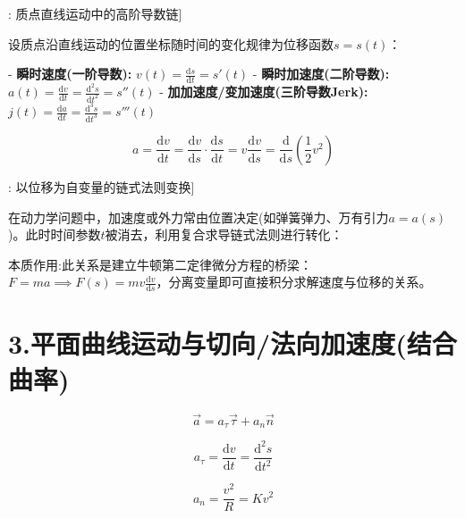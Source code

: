 \documentclass[11pt,a4paper,UTF8]{ctexart}
\begin{document}
\begin{thmbox}[原理[1]: 质点直线运动中的高阶导数链]

设质点沿直线运动的位置坐标随时间的变化规律为位移函数$s = s(t)$：

- \textbf{瞬时速度(一阶导数):} $v(t) = \frac{\mathrm{d}s}{\mathrm{d}t} = s'(t)$
- \textbf{瞬时加速度(二阶导数):} $a(t) = \frac{\mathrm{d}v}{\mathrm{d}t} = \frac{\mathrm{d}^2s}{\mathrm{d}t^2} = s''(t)$
- \textbf{加加速度/变加速度(三阶导数Jerk):} $j(t) = \frac{\mathrm{d}a}{\mathrm{d}t} = \frac{\mathrm{d}^3s}{\mathrm{d}t^3} = s'''(t)$

\end{thmbox}

\begin{equation*}
a = \frac{\mathrm{d}v}{\mathrm{d}t} = \frac{\mathrm{d}v}{\mathrm{d}s} \cdot \frac{\mathrm{d}s}{\mathrm{d}t} = v \frac{\mathrm{d}v}{\mathrm{d}s} = \frac{\mathrm{d}}{\mathrm{d}s}\left(\frac{1}{2}v^2\right)
\end{equation*}
\begin{thmbox}[原理[2]: 以位移为自变量的链式法则变换]

在动力学问题中，加速度或外力常由位置决定(如弹簧弹力、万有引力$a = a(s)$)。此时时间参数$t$被消去，利用复合求导链式法则进行转化：


本质作用:此关系是建立牛顿第二定律微分方程的桥梁：$F = ma \implies F(s) = mv \frac{\mathrm{d}v}{\mathrm{d}s}$，分离变量即可直接积分求解速度与位移的关系。

\end{thmbox}

\section{3.平面曲线运动与切向/法向加速度(结合曲率)}


\begin{equation*}
\vec{a} = a_\tau \vec{\tau} + a_n \vec{n}
\end{equation*}

\begin{equation*}
a_\tau = \frac{\mathrm{d}v}{\mathrm{d}t} = \frac{\mathrm{d}^2s}{\mathrm{d}t^2}
\end{equation*}

\begin{equation*}
a_n = \frac{v^2}{R} = K v^2
\end{equation*}
\end{document}
